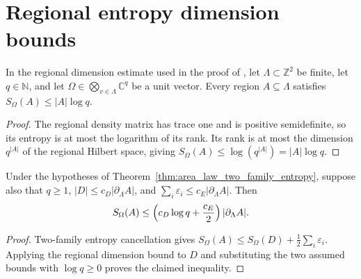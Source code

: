\section{Regional entropy dimension bounds}

\begin{lemma}
    \label{thm:area_law_entropy_dimension}
    \leanok
    In the regional dimension estimate used in the proof of
    \cite[Theorem~1.1]{OpenAI2026AreaLaw}, let $\Lambda\subset\mathbb Z^2$ be
    finite, let $q\in\mathbb N$, and let
    $\Omega\in\bigotimes_{v\in\Lambda}\mathbb C^q$ be a unit vector.
    Every region $A\subseteq\Lambda$ satisfies $S_\Omega(A)\le |A|\log q$.
\end{lemma}
\begin{proof}
    \leanok
    The regional density matrix has trace one and is positive semidefinite,
    so its entropy is at most the logarithm of its rank. Its rank is at most
    the dimension $q^{|A|}$ of the regional Hilbert space, giving
    $S_\Omega(A)\le\log(q^{|A|})=|A|\log q$.
\end{proof}

\begin{lemma}
    \label{thm:area_law_boundary_assembly}
    \leanok
    Under the hypotheses of Theorem~\ref{thm:area_law_two_family_entropy},
    suppose also that $q\ge1$, $|D|\le c_D|\partial_\Lambda A|$, and
    $\sum_i\varepsilon_i\le c_E|\partial_\Lambda A|$. Then
    \begin{align}
        S_\Omega(A)\le
        \left(c_D\log q+\frac{c_E}{2}\right)|\partial_\Lambda A|.
        \notag
    \end{align}
\end{lemma}
\begin{proof}
    \leanok
    Two-family entropy cancellation gives
    $S_\Omega(A)\le S_\Omega(D)+\frac12\sum_i\varepsilon_i$.
    Applying the regional dimension bound to $D$ and substituting the two assumed
    bounds with $\log q\ge0$ proves the claimed inequality.
\end{proof}
